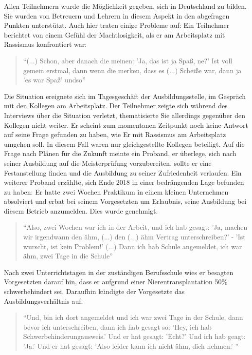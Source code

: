 Allen Teilnehmern wurde die Möglichkeit gegeben, sich in Deutschland zu bilden. Sie wurden von Betreuern und Lehrern in diesem Aspekt in den abgefragen Punkten unterstützt.
Auch hier traten einige Probleme auf:
Ein Teilnehmer berichtet von einem Gefühl der Machtlosigkeit, als er am Arbeitsplatz mit Rassismus konfrontiert war:
\begin{quote}
    ``(...) Schon, aber danach die meinen: 'Ja, das ist ja Spaß, ne?' Ist voll gemein erstmal, dann wenn die merken, dass es (...) Scheiße war, dann ja 'es war Spaß' undso''
\end{quote}
Die Situation ereignete sich im Tagesgeschäft der Ausbildungsstelle, im Gespräch mit den Kollegen am Arbeitsplatz. Der Teilnehmer zeigte sich während des Interviews über die Situation verletzt, thematisierte Sie allerdings gegenüber den Kollegen nicht weiter. Er scheint zum momentanen Zeitpunkt noch keine Antwort auf seine Frage gefunden zu haben, wie Er mit Rassismus am Arbeitsplatz umgehen soll. In diesem Fall waren nur gleichgestellte Kollegen beteiligt.\newline
Auf die Frage nach Plänen für die Zukunft meinte ein Proband, er überlege, sich nach seiner Ausbildung auf die Meisterprüfung vorzubereiten, sollte er eine Festanstellung finden und die Ausbildung zu seiner Zufriedenheit verlaufen.
Ein weiterer Proband erzählte, sich Ende 2018 in einer bedrängenden Lage befunden zu haben:
Er hatte zwei Wochen Praktikum in einem kleinen Unternehmen absolviert und erbat bei seinem Vorgesetzten um Erlaubnis, seine Ausbildung bei diesem Betrieb anzumelden. Dies wurde genehmigt.\newline
\begin{quote}
    ``Also, zwei Wochen war ich in der Arbeit, und ich hab gesagt: 'Ja, machen wir irgendwann den ähm, (...) den (...) ähm Vertrag unterschreiben?' - 'Ist wurscht, ist kein Problem!' (...) Dann ich hab Schule angemeldet, ich war ähm, zwei Tage in die Schule''
\end{quote}
Nach zwei Unterrichtstagen in der zuständigen Berufsschule wies er besagten Vorgesetzten darauf hin, dass er aufgrund einer Nierentransplantation 50\% schwerbehindert sei. Daraufhin kündigte der Vorgesetzte das Ausbildungsverhältnis auf.
\begin{quote}
    ``Und, bin ich dort angemeldet und ich war zwei Tage in der Schule, dann bevor ich unterschreiben, dann ich hab gesagt so: 'Hey, ich hab Schwerbehinderungausweis.' Und er hat gesagt: 'Echt?' Und ich hab geagt: 'Ja.' Und er hat gesagt: 'Also leider kann ich nicht ähm, dich nehmen.' ''
\end{quote}
